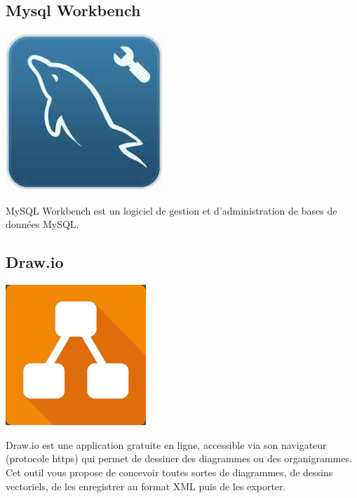 			\subsection*{Mysql Workbench}
				\begin{center}
					\includegraphics[scale=0.5]{chap_2/workbench.jpeg}
					\label{Mysql Workbench}
					\cite{logo_workbench}
				\end{center}
				MySQL Workbench est un logiciel de gestion et d'administration de bases de données MySQL.
			\subsection*{Draw.io}
				\begin{center}
					\includegraphics[scale=2]{chap_2/drawio.png}
					\label{Draw.io}
					\cite{logo_drawio}
				\end{center}
			Draw.io est une application gratuite en ligne, accessible via son navigateur (protocole https) qui permet de dessiner des diagrammes ou des organigrammes. Cet outil vous propose de concevoir toutes sortes de diagrammes, de dessins vectoriels, de les enregistrer au format XML puis de les exporter.\cite{draw_definition}